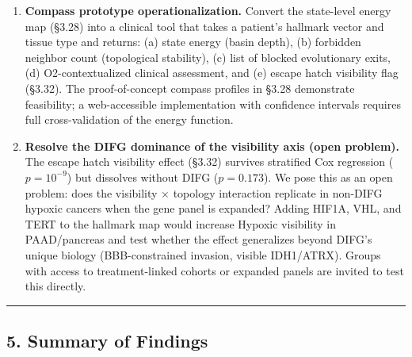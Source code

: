 \documentclass[
  11pt,
]{article}
\begin{document}
\begin{enumerate}
  staining) would allow continuous estimation of the phase boundary and
  higher-resolution energy maps. The per-cancer gradient
  (\(r = +0.399\), \(p = 0.020\)) suggests the transition is smooth, not
  a sharp critical point.
\item
  \textbf{Compass prototype operationalization.} Convert the state-level
  energy map (§3.28) into a clinical tool that takes a patient's
  hallmark vector and tissue type and returns: (a) state energy (basin
  depth), (b) forbidden neighbor count (topological stability), (c) list
  of blocked evolutionary exits, (d) O2-contextualized clinical
  assessment, and (e) escape hatch visibility flag (§3.32). The
  proof-of-concept compass profiles in §3.28 demonstrate feasibility; a
  web-accessible implementation with confidence intervals requires full
  cross-validation of the energy function.
\item
  \textbf{Resolve the DIFG dominance of the visibility axis (open
  problem).} The escape hatch visibility effect (§3.32) survives
  stratified Cox regression (\(p = 10^{-9}\)) but dissolves without DIFG
  (\(p = 0.173\)). We pose this as an open problem: does the visibility
  × topology interaction replicate in non-DIFG hypoxic cancers when the
  gene panel is expanded? Adding HIF1A, VHL, and TERT to the hallmark
  map would increase Hypoxic visibility in PAAD/pancreas and test
  whether the effect generalizes beyond DIFG's unique biology
  (BBB-constrained invasion, visible IDH1/ATRX). Groups with access to
  treatment-linked cohorts or expanded panels are invited to test this
  directly.
\end{enumerate}

\begin{center}\rule{0.5\linewidth}{0.5pt}\end{center}

\subsection{5. Summary of Findings}\label{summary-of-findings}
\end{document}
